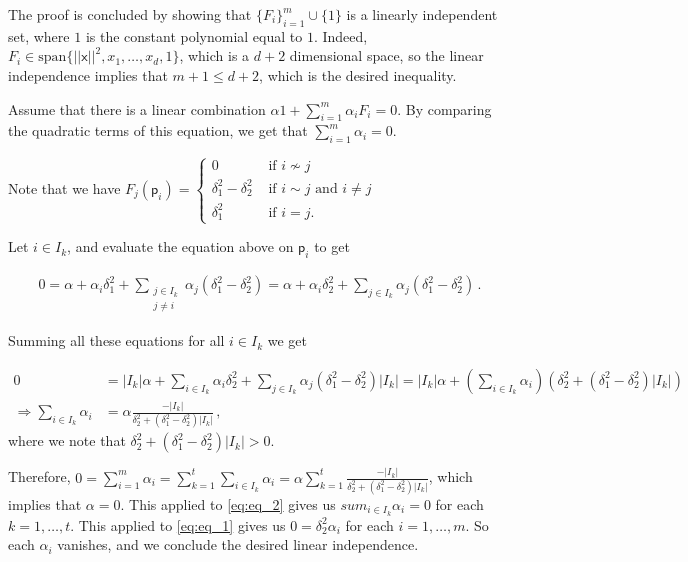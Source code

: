 \documentclass[kulak]{tplt}
\theoremstyle{definition}
\newcommand{\vx}{\mathsf{x}}
\newcommand{\vp}{\mathsf{p}}
\newcommand{\spn}{\mathrm{span}}
\begin{document}
\begin{enumerate}
\begin{enumerate}
The proof is concluded by showing that $\{F_i\}_{i=1}^m \cup \{ 1 \}$ is a linearly independent set, where $1$ is the constant polynomial equal to $1$.
Indeed, $F_i \in \spn \{ ||\vx||^2, x_1, \ldots, x_d, 1\}$, which is a $d+2$ dimensional space, so the linear independence implies that $m+1 \leq d+2$, which is the desired inequality.

Assume that there is a linear combination $\alpha 1 + \sum_{i=1}^m \alpha_i F_i = 0 $.
By comparing the quadratic terms of this equation, we get that $\sum_{i=1}^m \alpha_i = 0$.

Note that we have 
$F_j(\vp_i) = \begin{cases} 0& \text{ if $i \not\sim j$} \\ \delta_1^2 - \delta_2^2& \text{ if $i\sim j$ and $i\neq j$} \\ \delta_1^2& \text{ if $i = j$.}\end{cases}$

Let $i \in I_k$, and evaluate the equation above on $\vp_i$ to get


\begin{equation}\label{eq:eq_1}
\begin{split}
0 = \alpha + \alpha_i \delta_1^2 + \sum_{\substack{j\in I_k \\ j \neq i}} \alpha_j (\delta_1^2-\delta_2^2) = \alpha + \alpha_i \delta_2^2 + \sum_{j\in I_k } \alpha_j (\delta_1^2-\delta_2^2)\, . 
\end{split}
\end{equation}

Summing all these equations for all $i\in I_k$ we get

\begin{equation}\label{eq:eq_2}
\begin{split}
0 &= |I_k|\alpha + \sum_{i\in I_k} \alpha_i \delta_2^2 + \sum_{j\in I_k } \alpha_j (\delta_1^2-\delta_2^2)|I_k| = |I_k|\alpha + \left( \sum_{i\in I_k} \alpha_i \right) \left( \delta_2^2 + (\delta_1^2-\delta_2^2)|I_k|  \right) \\
\Rightarrow \sum_{i \in I_k} \alpha_i &= \alpha \frac{-|I_k|}{\delta_2^2 + (\delta_1^2-\delta_2^2)|I_k|} \, ,
\end{split}
\end{equation}
where we note that $\delta_2^2 + (\delta_1^2-\delta_2^2)|I_k| > 0 $.

Therefore, $0 = \sum_{i=1}^m \alpha_i = \sum_{k = 1}^t \sum_{i \in I_k} \alpha_i = \alpha \sum_{k=1}^t \frac{-|I_k|}{\delta_2^2 + (\delta_1^2-\delta_2^2)|I_k|}$, which implies that $\alpha = 0$.
This applied to \eqref{eq:eq_2} gives us $sum_{i \in I_k} \alpha_i  = 0$ for each $k = 1, \ldots, t$.
This applied to \eqref{eq:eq_1} gives us $ 0 = \delta_2^2 \alpha_ i$ for each $i = 1, \ldots, m$.
So each $\alpha_i $ vanishes, and we conclude the desired linear independence.


\end{enumerate}
\end{enumerate}
\end{document}
